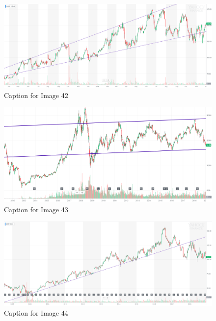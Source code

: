 \documentclass{article}
\begin{document}
\begin{figure}[!htb]
    \centering
    \includegraphics[width=\textwidth]{imgs/42.png}
    \caption{Caption for Image 42}
\end{figure}

\vspace{10pt}

\begin{figure}[!htb]
    \centering
    \includegraphics[width=\textwidth]{imgs/43.png}
    \caption{Caption for Image 43}
\end{figure}

\vspace{10pt}

\begin{figure}[!htb]
    \centering
    \includegraphics[width=\textwidth]{imgs/44.png}
    \caption{Caption for Image 44}
\end{figure}
\end{document}
